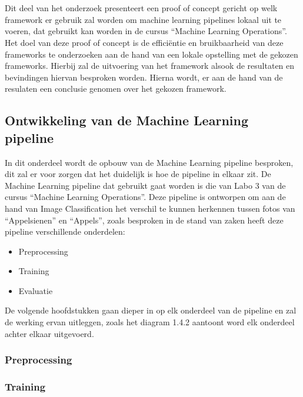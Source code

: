 \chapter{}%
\label{ch:PoC}

Dit deel van het onderzoek presenteert een proof of concept gericht op welk framework er gebruik zal worden om machine learning pipelines lokaal uit te voeren, dat gebruikt kan worden in de cursus ``Machine Learning Operations''.
Het doel van deze proof of concept is de efficiëntie en bruikbaarheid van deze frameworks te onderzoeken aan de hand van een lokale opstelling met de gekozen frameworks. Hierbij zal de uitvoering van het framework alsook de resultaten en bevindingen hiervan besproken worden.
Hierna wordt, er aan de hand van de resulaten een conclusie genomen over het gekozen framework.

\section{Ontwikkeling van de Machine Learning pipeline}
In dit onderdeel wordt de opbouw van de Machine Learning pipeline besproken, dit zal er voor zorgen dat het duidelijk is hoe de pipeline in elkaar zit.
De Machine Learning pipeline dat gebruikt gaat worden is die van Labo 3 van de cursus ``Machine Learning Operations''. Deze pipeline is ontworpen om aan de hand van Image Classification het verschil te kunnen herkennen tussen fotos van ``Appelsienen'' en ``Appels'', zoals besproken in de stand van zaken heeft deze pipeline verschillende onderdelen:

\begin{itemize}
    \item Preprocessing
    \item Training
    \item Evaluatie
\end{itemize}

De volgende hoofdstukken gaan dieper in op elk onderdeel van de pipeline en zal de werking ervan uitleggen, zoals het diagram 1.4.2 aantoont word elk onderdeel achter elkaar uitgevoerd.

\subsection{Preprocessing}

\subsection{Training}
